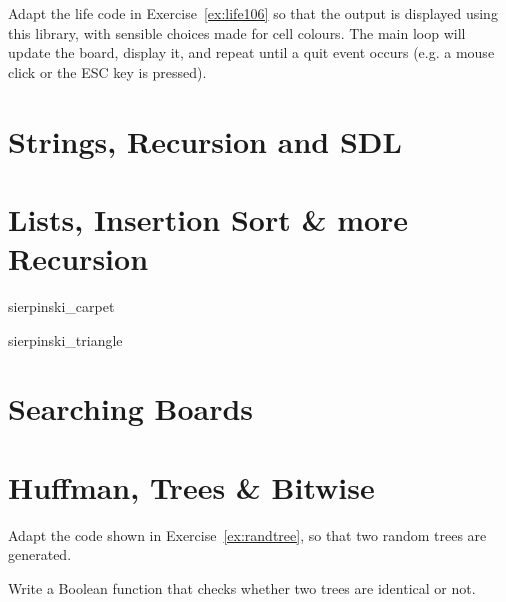 \begin{exercise}
Adapt the life code in Exercise~\ref{ex:life106} so that the output is
displayed using this library, with sensible choices made for cell colours.
The main loop will update the board, display it, and repeat until a quit
event occurs (e.g. a mouse click or the ESC key is pressed).
\end{exercise}

\chapter{Strings, Recursion and SDL}
















\chapter{Lists, Insertion Sort \& more Recursion}





 {sierpinski_carpet}

 {sierpinski_triangle}

\chapter{Searching Boards}








\setcounter{chapter}{8}
\chapter{Huffman, Trees \& Bitwise}



Adapt the code shown in Exercise~\ref{ex:randtree}, so that two random trees are generated.
\begin{exercise}
Write a Boolean function that checks whether two trees are identical or not.
\end{exercise}

